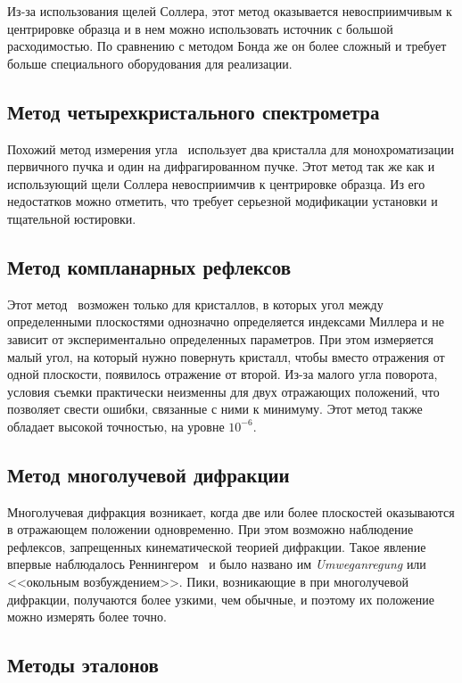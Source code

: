 \documentclass[a4paper,14pt]{extarticle}
\begin{document}
Из-за использования щелей Соллера, этот метод оказывается невосприимчивым к центрировке образца и в нем можно использовать источник с большой расходимостью.
По сравнению с методом Бонда же он более сложный и требует больше специального оборудования для реализации.

\subsection{Метод четырехкристального спектрометра}

Похожий метод измерения угла~\cite{Fewster:1989} использует два кристалла для монохроматизации первичного пучка и один на дифрагированном пучке.
Этот метод так же как и использующий щели Соллера невосприимчив к центрировке образца.
Из его недостатков можно отметить, что  требует серьезной модификации установки и тщательной юстировки.

\subsection{Метод компланарных рефлексов}

Этот метод~\cite{Isomae:1976} возможен только для кристаллов, в которых угол между определенными плоскостями однозначно определяется индексами Миллера и не зависит от экспериментально определенных параметров.
При этом измеряется малый угол, на который нужно повернуть кристалл, чтобы вместо отражения от одной плоскости, появилось отражение от второй.
Из-за малого угла поворота, условия съемки практически неизменны для двух отражающих положений, что позволяет свести ошибки, связанные с ними к минимуму.
Этот метод также обладает высокой точностью, на уровне $10^{-6}$.

\subsection{Метод многолучевой дифракции}

Многолучевая дифракция возникает, когда две или более плоскостей оказываются в отражающем положении одновременно.
При этом возможно наблюдение рефлексов, запрещенных кинематической теорией дифракции.
Такое явление впервые наблюдалось Реннингером~\cite{Renninger:1937} и было названо им \textit{Umweganregung} или <<окольным возбуждением>>.
Пики, возникающие в при многолучевой дифракции, получаются более узкими, чем обычные, и поэтому их положение можно измерять более точно.

\subsection{Методы эталонов}
\end{document}
